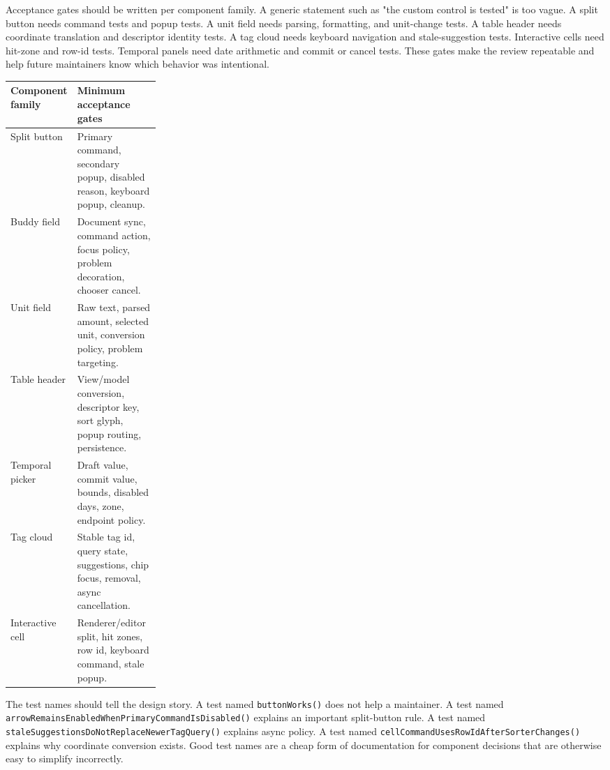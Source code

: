 Acceptance gates should be written per component family. A generic statement such as
"the custom control is tested" is too vague. A split button needs command tests and
popup tests. A unit field needs parsing, formatting, and unit-change tests. A table
header needs coordinate translation and descriptor identity tests. A tag cloud needs
keyboard navigation and stale-suggestion tests. Interactive cells need hit-zone and
row-id tests. Temporal panels need date arithmetic and commit or cancel tests. These
gates make the review repeatable and help future maintainers know which behavior was
intentional.

\begin{tabularx}{0.96\linewidth}{@{}p{0.25\linewidth}X@{}}
\toprule
Component family & Minimum acceptance gates\\
\midrule
Split button & Primary command, secondary popup, disabled reason, keyboard popup, cleanup.\\
Buddy field & Document sync, command action, focus policy, problem decoration, chooser cancel.\\
Unit field & Raw text, parsed amount, selected unit, conversion policy, problem targeting.\\
Table header & View/model conversion, descriptor key, sort glyph, popup routing, persistence.\\
Temporal picker & Draft value, commit value, bounds, disabled days, zone, endpoint policy.\\
Tag cloud & Stable tag id, query state, suggestions, chip focus, removal, async cancellation.\\
Interactive cell & Renderer/editor split, hit zones, row id, keyboard command, stale popup.\\
\bottomrule
\end{tabularx}

The test names should tell the design story. A test named
\texttt{buttonWorks()} does not help a maintainer. A test named
\texttt{arrowRemainsEnabledWhenPrimaryCommandIsDisabled()} explains an important
split-button rule. A test named
\texttt{staleSuggestionsDoNotReplaceNewerTagQuery()} explains async policy. A
test named \texttt{cellCommandUsesRowIdAfterSorterChanges()} explains why
coordinate conversion exists. Good test names are a cheap form of documentation
for component decisions that are otherwise easy to simplify incorrectly.

